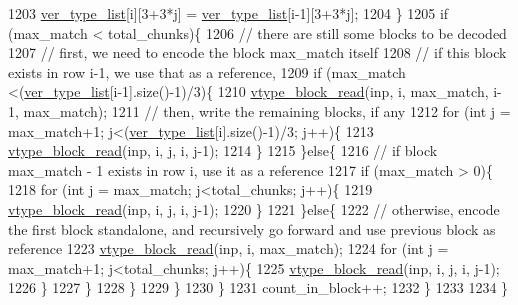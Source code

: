 \begin{DoxyCode}
1203         \hyperlink{classmarked__graph__compressed_af2e3e55223d436628a02758dfae88493}{ver\_type\_list}[i][3+3*j] = \hyperlink{classmarked__graph__compressed_af2e3e55223d436628a02758dfae88493}{ver\_type\_list}[i-1][3+3*j];
1204       \}
1205       \textcolor{keywordflow}{if} (max\_match < total\_chunks)\{
1206         \textcolor{comment}{// there are still some blocks to be decoded}
1207         \textcolor{comment}{// first, we need to encode the block max\_match itself}
1208         \textcolor{comment}{// if this block exists in row i-1, we use that as a reference,}
1209         \textcolor{keywordflow}{if} (max\_match <(\hyperlink{classmarked__graph__compressed_af2e3e55223d436628a02758dfae88493}{ver\_type\_list}[i-1].size()-1)/3)\{
1210           \hyperlink{classmarked__graph__compressed_a4bf8563a2dfd3038dc5833c014320487}{vtype\_block\_read}(inp, i, max\_match, i-1, max\_match);
1211           \textcolor{comment}{// then, write the remaining blocks, if any}
1212           \textcolor{keywordflow}{for} (\textcolor{keywordtype}{int} j = max\_match+1; j<(\hyperlink{classmarked__graph__compressed_af2e3e55223d436628a02758dfae88493}{ver\_type\_list}[i].size()-1)/3; j++)\{
1213             \hyperlink{classmarked__graph__compressed_a4bf8563a2dfd3038dc5833c014320487}{vtype\_block\_read}(inp, i, j, i, j-1);
1214           \}
1215         \}\textcolor{keywordflow}{else}\{
1216           \textcolor{comment}{// if block max\_match - 1 exists in row i, use it as a reference}
1217           \textcolor{keywordflow}{if} (max\_match > 0)\{
1218             \textcolor{keywordflow}{for} (\textcolor{keywordtype}{int} j = max\_match; j<total\_chunks; j++)\{
1219               \hyperlink{classmarked__graph__compressed_a4bf8563a2dfd3038dc5833c014320487}{vtype\_block\_read}(inp, i, j, i, j-1);
1220             \}
1221           \}\textcolor{keywordflow}{else}\{
1222             \textcolor{comment}{// otherwise, encode the first block standalone, and recursively go forward and use previous
       block as reference }
1223             \hyperlink{classmarked__graph__compressed_a4bf8563a2dfd3038dc5833c014320487}{vtype\_block\_read}(inp, i, max\_match);
1224             \textcolor{keywordflow}{for} (\textcolor{keywordtype}{int} j = max\_match+1; j<total\_chunks; j++)\{
1225               \hyperlink{classmarked__graph__compressed_a4bf8563a2dfd3038dc5833c014320487}{vtype\_block\_read}(inp, i, j, i, j-1);
1226             \}
1227           \}
1228         \}
1229       \}
1230     \}
1231     count\_in\_block++;
1232   \}
1233 
1234 \}
\end{DoxyCode}
\mbox{\label{classmarked__graph__compressed_a889749dd51bc37917a156e337eac142a}} 
